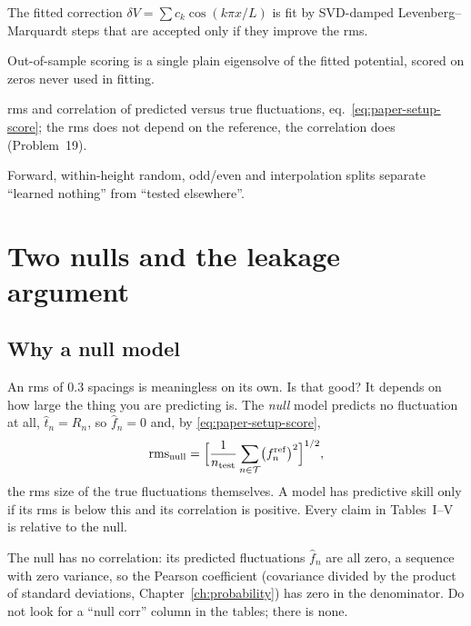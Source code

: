 \begin{keyideas}
\item The fitted correction $\delta V=\sum c_k\cos(k\pi x/L)$ is fit by SVD-damped Levenberg--Marquardt steps that are accepted only if they improve the rms.
\item Out-of-sample scoring is a single plain eigensolve of the fitted potential, scored on zeros never used in fitting.
\item rms and correlation of predicted versus true fluctuations, eq.~\eqref{eq:paper-setup-score}; the rms does not depend on the reference, the correlation does (Problem~19).
\item Forward, within-height random, odd/even and interpolation splits separate ``learned nothing'' from ``tested elsewhere''.
\end{keyideas}

\section{Two nulls and the leakage argument}\label{sec:paper-setup-nulls}

\subsection{Why a null model}

An rms of $0.3$ spacings is meaningless on its own. Is that good? It depends on how large the thing you are predicting is. The \emph{null} model predicts no fluctuation at all, $\hat t_n=R_n$, so $\hat f_n=0$ and, by \eqref{eq:paper-setup-score},
\begin{equation}
\mathrm{rms}_{\rm null}=\Bigl[\frac{1}{n_{\rm test}}\sum_{n\in\mathcal T}\bigl(f^{\rm ref}_n\bigr)^2\Bigr]^{1/2},
\label{eq:paper-setup-null}
\end{equation}
the rms size of the true fluctuations themselves. A model has predictive skill only if its rms is below this and its correlation is positive. Every claim in Tables~I--V is relative to the null.

\begin{pitfall}
The null has no correlation: its predicted fluctuations $\hat f_n$ are all zero, a sequence with zero variance, so the Pearson coefficient (covariance divided by the product of standard deviations, Chapter~\ref{ch:probability}) has zero in the denominator. Do not look for a ``null corr'' column in the tables; there is none.
\end{pitfall}

